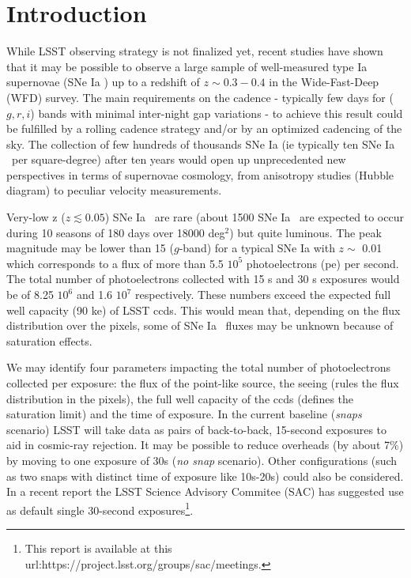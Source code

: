 \documentclass[\docopts]{\docclass}
\newcommand{\sne}{{SNe Ia }}
\newcommand{\pe}{{pe}}
\newcommand{\degsq}{deg$^2$}
\begin{document}
\section{Introduction}
\label{sec:intro}
While LSST observing strategy is not finalized yet, recent studies \cite{2018arXiv181200515L} have shown that it may be possible to observe a large sample of well-measured type Ia supernovae (\sne) up to a redshift of $z\sim 0.3-0.4$ in the Wide-Fast-Deep (WFD) survey. The main requirements on the cadence - typically few days for ($g,r,i$) bands with minimal inter-night gap variations - to achieve this result could be fulfilled by a rolling cadence strategy and/or by an optimized cadencing of the sky. The collection of few hundreds of thousands \sne (ie typically ten \sne~per square-degree) after ten years would open up unprecedented new perspectives in terms of supernovae cosmology, from anisotropy studies (Hubble diagram) to peculiar velocity measurements.\par
Very-low z ($z \lesssim 0.05$) \sne~are rare (about 1500 \sne~are expected to occur during 10 seasons of 180 days over 18000 \degsq) but quite luminous. The peak magnitude may be lower than 15 ($g$-band) for a typical \sne with $z\sim$ 0.01 which corresponds to a flux of more than 5.5 \textrm{$10^5$} photoelectrons (\pe) per second. The total number of photoelectrons collected with 15 s and 30 s exposures would be of 8.25 $ 10^{6}$ and 1.6 $ 10^{7}$ respectively.  These numbers exceed the expected full well capacity (90 ke) of LSST ccds. This would mean that, depending on the flux distribution over the pixels, some of \sne~fluxes may be unknown because of saturation effects. \par
We may identify four parameters impacting the total number of photoelectrons collected per exposure: the flux of the point-like source, the seeing (rules the flux distribution in the pixels), the full well capacity of the ccds (defines the saturation limit) and the time of exposure. In the current baseline ({\it snaps} scenario) LSST will take data as pairs of back-to-back, 15-second exposures to aid in cosmic-ray rejection. It may be possible to reduce overheads (by about 7\%) by moving to one exposure of 30s ({\it no snap} scenario). Other configurations (such as two snaps with distinct time of exposure like 10s-20s) could also be considered. In a recent report the LSST Science Advisory Commitee (SAC) has suggested use as default single 30-second exposures\footnote{This report is available at this url:https://project.lsst.org/groups/sac/meetings.}.\par
\end{document}
